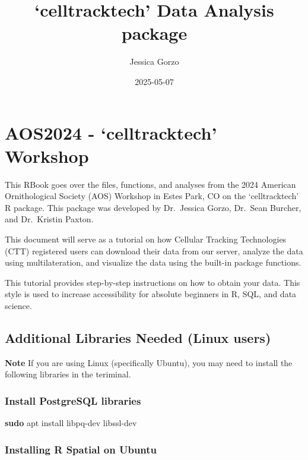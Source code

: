 \documentclass[
]{book}
\title{`celltracktech' Data Analysis package}
\author{Jessica Gorzo}
\date{2025-05-07}
\newenvironment{Shaded}{\begin{snugshade}}{\end{snugshade}}
\newcommand{\FunctionTok}[1]{\textcolor[rgb]{0.13,0.29,0.53}{\textbf{#1}}}
\newcommand{\NormalTok}[1]{#1}
\begin{document}
\maketitle

{
\setcounter{tocdepth}{1}
\tableofcontents
}
\chapter{AOS2024 - `celltracktech' Workshop}\label{aos2024---celltracktech-workshop}

This RBook goes over the files, functions, and analyses from the 2024 American Ornithological Society (AOS) Workshop in Estes Park, CO on the `celltracktech' R package. This package was developed by Dr.~Jessica Gorzo, Dr.~Sean Burcher, and Dr.~Kristin Paxton.

This document will serve as a tutorial on how Cellular Tracking Technologies (CTT) registered users can download their data from our server, analyze the data using multilateration, and visualize the data using the built-in package functions.

This tutorial provides step-by-step instructions on how to obtain your data. This style is used to increase accessibility for absolute beginners in R, SQL, and data science.

\section{Additional Libraries Needed (Linux users)}\label{additional-libraries-needed-linux-users}

\textbf{Note} If you are using Linux (specifically Ubuntu), you may need to install the following libraries in the teriminal.

\subsection{Install PostgreSQL libraries}\label{install-postgresql-libraries}

\begin{Shaded}
\begin{Highlighting}[]
\FunctionTok{sudo}\NormalTok{ apt install libpq{-}dev libssl{-}dev}
\end{Highlighting}
\end{Shaded}

\subsection{Installing R Spatial on Ubuntu}\label{installing-r-spatial-on-ubuntu}
\end{document}
